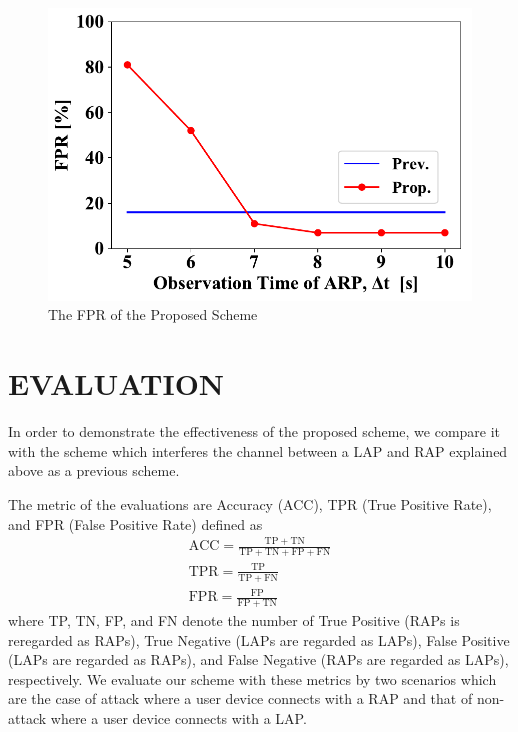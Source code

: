 \documentclass[conference]{IEEEtran}
\begin{document}
\begin{figure}[ht]
\begin{minipage}{0.33\hsize}
        \begin{center}
            \includegraphics[scale=0.4]{image/FPR.pdf}
        \end{center}
        \caption{The FPR of the Proposed Scheme}
        \label{fig:fpr}
    \end{minipage}

\end{figure}

\section{EVALUATION}\label{sec:5}
In order to demonstrate the effectiveness of the proposed scheme, we compare it with the scheme \cite{previous} which interferes the channel between a LAP and RAP explained above as a previous scheme.

The metric of the evaluations are Accuracy (ACC), TPR (True Positive Rate), and FPR (False Positive Rate) defined as
\begin{gather}
    \mathrm{ACC} = \frac{\mathrm{TP} + \mathrm{TN}}{\mathrm{TP} + \mathrm{TN} + \mathrm{FP} + \mathrm{FN}} \\
    \mathrm{TPR} = \frac{\mathrm{TP}}{\mathrm{TP} + \mathrm{FN}} \\
    \mathrm{FPR} = \frac{\mathrm{FP}}{\mathrm{FP} + \mathrm{TN}}
\end{gather}
where TP, TN, FP, and FN denote the number of True Positive (RAPs is reregarded as RAPs), True Negative (LAPs are regarded as LAPs), False Positive (LAPs are regarded as RAPs), and False Negative (RAPs are regarded as LAPs), respectively.
We evaluate our scheme with these metrics by two scenarios which are the case of attack where a user device connects with a RAP and that of non-attack where a user device connects with a LAP.
\end{document}
